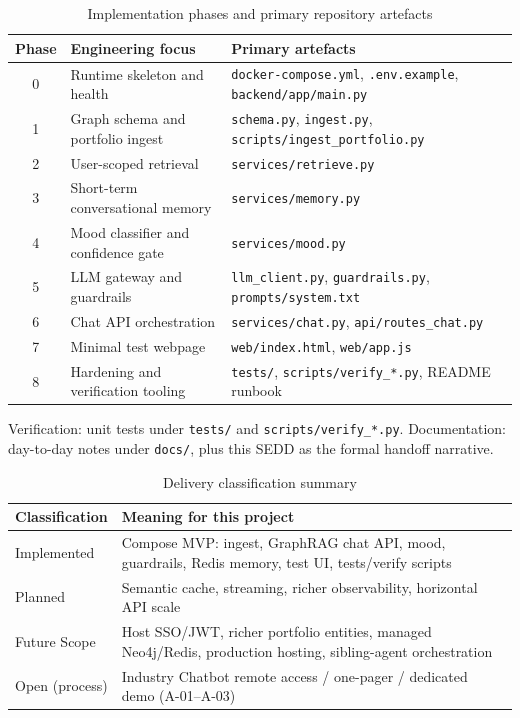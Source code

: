 \begin{table}[!htbp]
\centering
\small
\caption{Implementation phases and primary repository artefacts}
\label{tab:impl-phases}
\begin{tabularx}{\textwidth}{@{}cXX@{}}
\toprule
\textbf{Phase} & \textbf{Engineering focus} & \textbf{Primary artefacts} \\
\midrule
0 & Runtime skeleton and health & \texttt{docker-compose.yml}, \texttt{.env.example}, \texttt{backend/app/main.py} \\
1 & Graph schema and portfolio ingest & \texttt{schema.py}, \texttt{ingest.py}, \texttt{scripts/ingest\_portfolio.py} \\
2 & User-scoped retrieval & \texttt{services/retrieve.py} \\
3 & Short-term conversational memory & \texttt{services/memory.py} \\
4 & Mood classifier and confidence gate & \texttt{services/mood.py} \\
5 & LLM gateway and guardrails & \texttt{llm\_client.py}, \texttt{guardrails.py}, \texttt{prompts/system.txt} \\
6 & Chat API orchestration & \texttt{services/chat.py}, \texttt{api/routes\_chat.py} \\
7 & Minimal test webpage & \texttt{web/index.html}, \texttt{web/app.js} \\
8 & Hardening and verification tooling & \texttt{tests/}, \texttt{scripts/verify\_*.py}, README runbook \\
\bottomrule
\end{tabularx}
\end{table}

\noindent
Verification: unit tests under \texttt{tests/} and \texttt{scripts/verify\_*.py}. Documentation: day-to-day notes under \texttt{docs/}, plus this SEDD as the formal handoff narrative.

\begin{table}[!htbp]
\centering
\small
\caption{Delivery classification summary}
\label{tab:journey-status}
\begin{tabularx}{\textwidth}{@{}lX@{}}
\toprule
\textbf{Classification} & \textbf{Meaning for this project} \\
\midrule
Implemented & Compose MVP: ingest, GraphRAG chat API, mood, guardrails, Redis memory, test UI, tests/verify scripts \\
Planned & Semantic cache, streaming, richer observability, horizontal API scale \\
Future Scope & Host SSO/JWT, richer portfolio entities, managed Neo4j/Redis, production hosting, sibling-agent orchestration \\
Open (process) & Industry Chatbot remote access / one-pager / dedicated demo (A-01--A-03) \\
\bottomrule
\end{tabularx}
\end{table}

